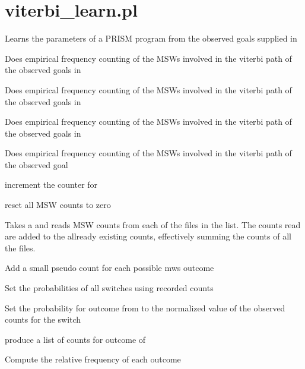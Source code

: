 


\section{viterbi_learn.pl}

\label{sec:viterbilearn}

\begin{description}
Learns the parameters of a PRISM program from the observed goals
supplied in 

Does empirical frequency counting of the MSWs involved
in the viterbi path of the observed goals in  

Does empirical frequency counting of the MSWs involved
in the viterbi path of the observed goals in  

Does empirical frequency counting of the MSWs involved
in the viterbi path of the observed goals in  

Does empirical frequency counting of the MSWs involved
in the viterbi path of the observed goal 

increment the counter for  

reset all MSW counts to zero 

Takes a  and reads MSW counts from each of the files
in the list. The counts read are added to the allready existing
counts, effectively summing the counts of all the files.


Add a small pseudo count for each possible mws outcome

Set the probabilities of all switches using recorded counts

Set the probability for outcome from  to the normalized value
of the observed counts for the switch

produce a list of counts for outcome of  

Compute the relative frequency of each outcome 
\end{description}

